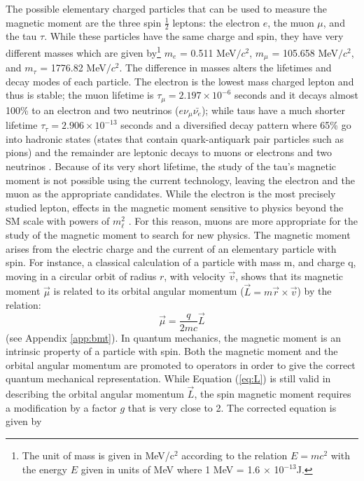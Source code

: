 \documentclass{outhesis}
\begin{document}
The possible elementary charged particles that can be used to measure the magnetic moment are the three spin $\frac{1}{2}$ leptons: the electron $e$, the muon $\mu$, and the tau $\tau$. While these particles have the same charge and spin, they have very different masses which are given by\footnote{The unit of mass is given in MeV/c$^2$ according to the relation $E = m c^2$ with the energy $E$ given in units of MeV where 1 MeV = 1.6 $\times$ 10$^{-13}$J.} $m_e$ = 0.511 MeV$/c^2$, $m_{\mu}$ = 105.658 MeV$/c^2$, and $m_{\tau}$ = 1776.82 MeV$/c^2$. The difference in masses alters the lifetimes and decay modes of each particle. The electron is the lowest mass charged lepton and thus is stable; the muon lifetime is $\tau_{\mu} = 2.197 \times 10^{-6}$ seconds and it decays almost 100\% to an electron and two neutrinos ($e\nu_{\mu}\bar{\nu_{e}}$); while taus have a much shorter lifetime $\tau_{\tau} = 2.906 \times 10^{-13}$ seconds and a diversified decay pattern where 65\% go into hadronic states (states that contain quark-antiquark pair particles such as pions) and the remainder are leptonic decays to muons or electrons and two neutrinos \cite{pdg}. Because of its very short lifetime, the study of the tau's magnetic moment is not possible using the current technology, leaving the electron and the muon as the appropriate candidates. While the electron is the most precisely studied lepton, effects in the magnetic moment sensitive to physics beyond the SM scale with powers of $m_\ell^2$
\cite{phen}. For this reason, muons are more appropriate for the study of the magnetic moment to search for new physics. 
The magnetic moment arises from the electric charge and the current of an elementary particle with spin. For instance, a classical calculation of a particle with mass m, and charge q, moving in a circular orbit of radius $r$, with velocity $\overrightarrow{v}$, shows that its magnetic moment $\overrightarrow{\mu}$ is related to its orbital angular momentum ($\overrightarrow{L} =m\overrightarrow{r} \times \overrightarrow{v}$) by the relation: 
\begin{equation}
\overrightarrow{\mu} = \frac{q}{2mc} \overrightarrow{L}
  \label{eq:L}
\end{equation}
(see Appendix \ref{app:bmt}).
In quantum mechanics, the magnetic moment is an intrinsic property of a particle with spin. Both the magnetic moment and the orbital angular momentum are promoted to operators in order to give the correct quantum mechanical representation. While Equation (\ref{eq:L}) is still valid in describing the orbital angular momentum $\overrightarrow{L}$, the spin magnetic moment requires a modification by a factor $g$ that is very close to 2. The corrected equation is given by
\end{document}
